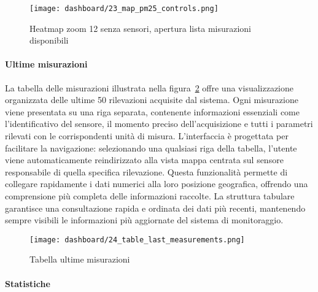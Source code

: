 \begin{figure}[H]
  \centering
  \texttt{[image: dashboard/23\_map\_pm25\_controls.png]}
  \caption{Heatmap zoom 12 senza sensori, apertura lista misurazioni disponibili}
  \label{fig:app-map-pm25-controls-23}
\end{figure}

\newpage

\paragraph{Ultime misurazioni}

La tabella delle misurazioni illustrata nella figura~\ref{fig:app-tab-last-measurements} offre una visualizzazione
organizzata delle ultime 50 rilevazioni acquisite dal sistema. Ogni misurazione viene presentata su una riga separata,
contenente informazioni essenziali come l'identificativo del sensore, il momento preciso dell'acquisizione e tutti
i parametri rilevati con le corrispondenti unità di misura.
L'interfaccia è progettata per facilitare la navigazione: selezionando una qualsiasi riga della tabella,
l'utente viene automaticamente reindirizzato alla vista mappa centrata sul sensore responsabile
di quella specifica rilevazione. Questa funzionalità permette di collegare rapidamente i dati numerici alla
loro posizione geografica, offrendo una comprensione più completa delle informazioni raccolte.
La struttura tabulare garantisce una consultazione rapida e ordinata dei dati più recenti,
mantenendo sempre visibili le informazioni più aggiornate del sistema di monitoraggio.

\begin{figure}[H]
  \centering
  \texttt{[image: dashboard/24\_table\_last\_measurements.png]}
  \caption{Tabella ultime misurazioni}
  \label{fig:app-tab-last-measurements}
\end{figure}

\newpage

\paragraph{Statistiche}

